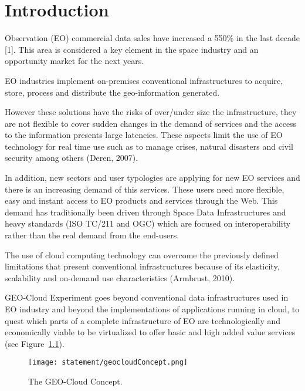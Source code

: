 \chapter{Introduction}

 Observation (\acs{EO}) commercial data sales have increased a 550\% in
the last decade \cite{sousa}[1]. This area is considered a key element in the
space industry and an opportunity market for the next years.

\ac{EO} industries implement on-premises conventional infrastructures to acquire,
store, process and distribute the geo-information generated.

However these solutions have the risks of over/under size the infrastructure, they are not flexible to cover sudden changes in the demand of services and the access to the information presents large latencies.  These aspects limit the use of \ac{EO} technology for real time use such as to manage crises, natural disasters and civil security among others (Deren, 2007).

In addition, new sectors and user typologies are applying for new \ac{EO} services
and there is an increasing demand of this services. These users
need more flexible, easy and instant access to \ac{EO} products and services through
the Web. This demand has traditionally been driven through Space Data
Infrastructures and heavy standards (\acs{ISO} TC/211 and \ac{OGC}) which are focused on
interoperability rather than the real demand from the end-users.

The use of cloud computing technology can overcome the previously defined limitations that present conventional infrastructures because of its elasticity, scalability and on-demand use characteristics (Armbrust, 2010).

GEO-Cloud Experiment goes beyond conventional data infrastructures used in \ac{EO}
industry and beyond the implementations of applications running in cloud, to
quest which parts of a complete infrastructure of \ac{EO} are technologically and
economically viable to be virtualized to offer basic and high added value
services (see Figure~\ref{fig:intr-geocloudConcept}).

\begin{figure}[!h]
\begin{center}
\texttt{[image: statement/geocloudConcept.png]}
\caption{The GEO-Cloud Concept.}
\label{fig:intr-geocloudConcept}
\end{center}
\end{figure}

